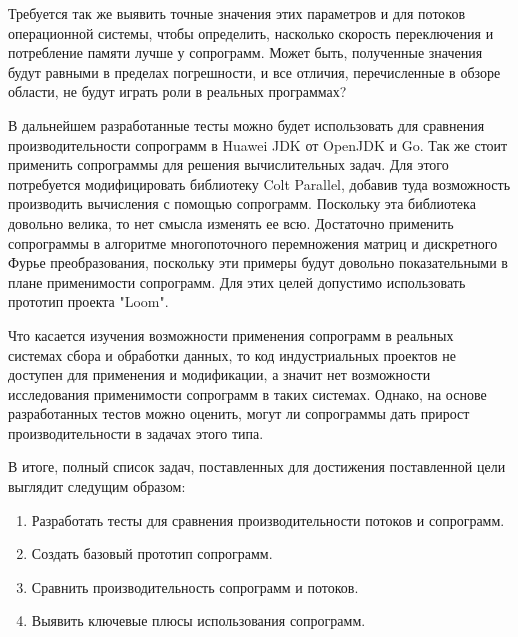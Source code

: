 	Требуется так же выявить точные значения этих параметров и для потоков операционной
	системы, чтобы определить, насколько скорость переключения и потребление памяти лучше
	у сопрограмм. Может быть, полученные значения будут равными в пределах погрешности,
	и все отличия, перечисленные в обзоре области, не будут играть роли в реальных программах?
	\par
	В дальнейшем разработанные тесты можно будет использовать для сравнения производительности сопрограмм в
	Huawei JDK от OpenJDK и Go. Так же стоит применить сопрограммы для решения вычислительных задач.
	Для этого потребуется модифицировать библиотеку Colt Parallel, добавив туда возможность производить
	вычисления с помощью сопрограмм. Поскольку эта библиотека довольно велика, то нет смысла
	изменять ее всю. Достаточно применить сопрограммы в алгоритме многопоточного перемножения
	матриц и дискретного Фурье преобразования, поскольку эти примеры будут довольно показательными в плане
	применимости сопрограмм. Для этих целей допустимо использовать прототип проекта "Loom".
	\par
	Что касается изучения возможности применения сопрограмм в реальных системах сбора и обработки данных,
	то код индустриальных проектов не доступен для применения и модификации, а значит нет возможности
	исследования применимости сопрограмм в таких системах. Однако, на основе разработанных тестов
	можно оценить, могут ли сопрограммы дать прирост производительности в задачах этого типа. 
	  
	В итоге, полный список задач, поставленных для достижения поставленной цели выглядит следущим образом:
	\begin{enumerate}[align=left]
	  	\item Разработать тесты для сравнения производительности потоков и сопрограмм.
	  	\item Создать базовый прототип сопрограмм.
	  	\item Сравнить производительность сопрограмм и потоков.
	  	\item Выявить ключевые плюсы использования сопрограмм.
	\end{enumerate}
\clearpage